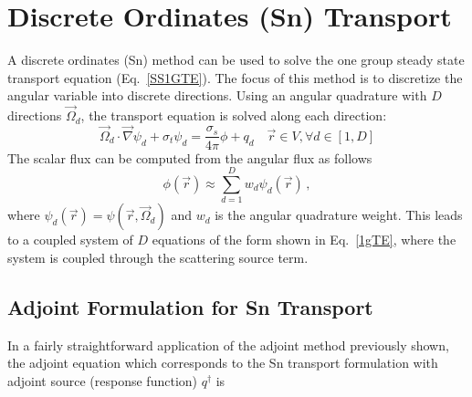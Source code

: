 \documentclass[12pt]{report}
\newcommand{\vr}{\vec{r}}
\newcommand{\vO}{\vec{\Omega}}
\newcommand{\grad}{\vec{\nabla}}
\newcommand{\sigt}{\sigma_t}
\newcommand{\sigs}{\sigma_s}
\newcommand{\angResp}{q^\dag}
\begin{document}
\section{Discrete Ordinates (Sn) Transport}
A discrete ordinates (Sn) method can be used to solve the one group steady state transport equation (Eq.~\eqref{SS1GTE}). The focus of this method is to discretize the angular variable into discrete directions. Using an angular quadrature with $D$ directions $\vO_d$, the transport equation is solved along each direction:
\begin{equation}
\label{1gTE}
\vO_d \cdot \grad \psi_d + \sigt \psi_d = \frac{\sigs}{4 \pi} \phi + q_d \quad \vr \in V , \forall d\in [1,D]
\end{equation}
%
The scalar flux can be computed from the angular flux as follows
\[
\phi(\vr) \approx \sum_{d=1}^D w_d \psi_d(\vr) \,,
\] 
where $\psi_d(\vr) = \psi(\vr, \vO_d)$ and $w_d$ is the angular quadrature weight. This leads to a coupled system of $D$ equations of the form shown in Eq.~\eqref{1gTE}, where the system is coupled through the scattering source term.



\subsection{Adjoint Formulation for Sn Transport}
In a fairly straightforward application of the adjoint method previously shown, the adjoint equation which corresponds to the Sn transport formulation with adjoint source (response function)
$\angResp$ is
\end{document}
